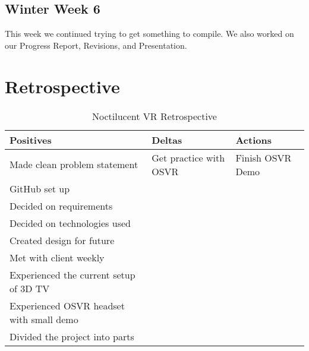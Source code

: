 \documentclass{article}
\begin{document}
\subsection{Winter Week 6}

This week we continued trying to get something to compile.
We also worked on our Progress Report, Revisions, and Presentation.

\section{Retrospective}

\begin{table}[ht]
\caption{Noctilucent VR Retrospective}
\centering
\begin{tabular}{l l l}
\hline\hline
Positives & Deltas & Actions \\ [0.5ex]
\hline
Made clean problem statement & Get practice with OSVR & Finish OSVR Demo \\
GitHub set up & & \\
Decided on requirements & & \\
Decided on technologies used & & \\
Created design for future &  & \\
Met with client weekly & & \\
Experienced the current setup of 3D TV & & \\
Experienced OSVR headset with small demo & & \\
Divided the project into parts & & \\ [1ex]
\hline
\end{tabular}
\end{table}
\end{document}
